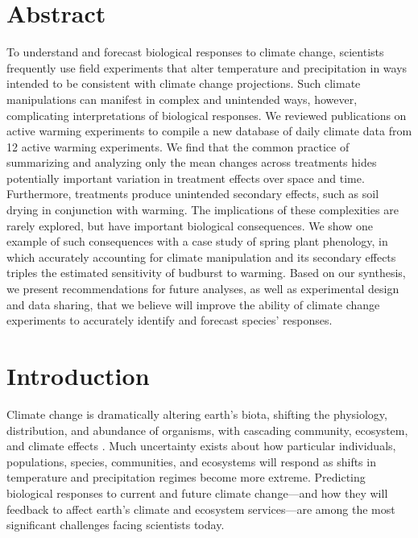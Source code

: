 \documentclass{article}
\begin{document}
\linenumbers

\section* {Abstract} 
\par To understand and forecast biological responses to climate change, scientists frequently use field experiments that alter temperature and precipitation in ways intended to be consistent with climate change projections. Such climate manipulations can manifest in complex and unintended ways, however, complicating interpretations of biological responses. We reviewed publications on active warming experiments to compile a new database of daily climate data from 12 active warming experiments. We find that the common practice of summarizing and analyzing only the mean changes across treatments hides potentially important variation in treatment effects over space and time.%
Furthermore, treatments produce unintended secondary effects, such as soil drying in conjunction with warming. The implications of these complexities are rarely explored, but have important biological consequences. We show one example of such consequences with a case study of spring plant phenology, in which accurately accounting for climate manipulation and its secondary effects triples the estimated sensitivity of budburst to warming. Based on our synthesis, we present recommendations for future analyses, as well as experimental design and data sharing, that we believe will improve the ability of climate change experiments to accurately identify and forecast species' responses.
\section* {Introduction}
\par Climate change is dramatically altering earth's biota, shifting the physiology, distribution, and abundance of organisms, with cascading community, ecosystem, and climate effects \citep{shukla1982,cox2000,thomas2004,parmesan2006,field2007,sheldon2011,urban2012}. Much uncertainty exists about how particular individuals, populations, species, communities, and ecosystems will respond as shifts in temperature and precipitation regimes become more extreme. Predicting biological responses to current and future climate change---and how they will feedback to affect earth's climate and ecosystem services---are among the most significant challenges facing scientists today.
\end{document}
